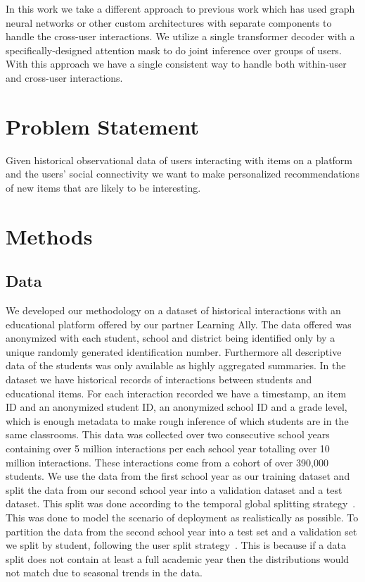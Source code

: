 \documentclass{article}
\begin{document}
In this work we take a different approach to previous work which has used graph neural networks or other custom architectures with separate components to handle the cross-user interactions. We utilize a single transformer decoder with a specifically-designed attention mask to do joint inference over groups of users. With this approach we have a single consistent way to handle both within-user and cross-user interactions.

\section{Problem Statement}
\label{section:problem}
Given historical observational data of users interacting with items on a platform and the users' social connectivity we want to make personalized recommendations of new items that are likely to be interesting.

\section{Methods}
\label{sec:methods}
\subsection{Data}
\label{section:data}
We developed our methodology on a dataset of historical interactions with an educational platform offered by our partner Learning Ally. The data offered was anonymized with each student, school and district being identified only by a unique randomly generated identification number. Furthermore all descriptive data of the students was only available as highly aggregated summaries. In the dataset we have historical records of interactions between students and educational items. For each interaction recorded we have a timestamp, an item ID and an anonymized student ID, an anonymized school ID and a grade level, which is enough metadata to make rough inference of which students are in the same classrooms. This data was collected over two consecutive school years containing over 5 million interactions per each school year totalling over 10 million interactions. These interactions come from a cohort of over 390,000 students. We use the data from the first school year as our training dataset and split the data from our second school year into a validation dataset and a test dataset. This split was done according to the temporal global splitting strategy~\cite{meng2020split}. This was done to model the scenario of deployment as realistically as possible. To partition the data from the second school year into a test set and a validation set we split by student, following the user split strategy~\cite{meng2020split}. This is because if a data split does not contain at least a full academic year then the distributions would not match due to seasonal trends in the data. 
\end{document}

